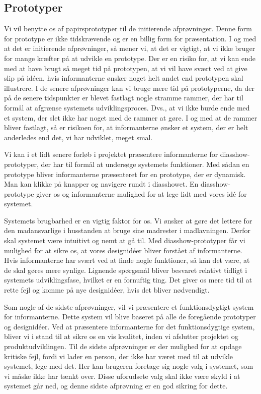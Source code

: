 \subsection{Prototyper}
\label{subsec:prototyper}

Vi vil benytte os af papirsprototyper til de initierende afprøvninger. Denne form for prototype er ikke tidskrævende og er en billig form for præsentation. I og med at det er initierende afprøvninger, så mener vi, at det er vigtigt, at vi ikke bruger for mange kræfter på at udvikle en prototype. Der er en risiko for, at vi kan ende med at have brugt så meget tid på prototypen, at vi vil have svært ved at give slip på idéen, hvis informanterne ønsker noget helt andet end prototypen skal illustrere. I de senere afprøvninger kan vi bruge mere tid på prototyperne, da der på de senere tidspunkter er blevet fastlagt nogle stramme rammer, der har til formål at afgrænse systemets udviklingsproces. Dvs., at vi ikke burde ende med et system, der slet ikke har noget med de rammer at gøre. I og med at de rammer bliver fastlagt, så er risikoen for, at informanterne ønsker et system, der er helt anderledes end det, vi har udviklet, meget smal.

Vi kan i et lidt senere forløb i projektet præsentere informanterne for diasshow-prototyper, der har til formål at undersøge systemets funktioner. Med sådan en prototype bliver informanterne præsenteret for en prototype, der er dynamisk. Man kan klikke på knapper og navigere rundt i diasshowet. En diasshow-prototype giver os og informanterne mulighed for at lege lidt med vores idé for systemet. 

Systemets brugbarhed er en vigtig faktor for os. Vi ønsker at gøre det lettere for den madansvarlige i husstanden at bruge sine madrester i madlavningen. Derfor skal systemet være intuitivt og nemt at gå til. Med diasshow-prototyper får vi mulighed for at sikre os, at vores designidéer bliver forstået af informanterne. Hvis informanterne \fx har svært ved at finde nogle funktioner, så kan det være, at de skal gøres mere synlige. Lignende spørgsmål bliver besvaret relativt tidligt i systemets udviklingsfase, hvilket er en fornuftig ting. Det giver os mere tid til at rette fejl og komme på nye designidéer, hvis det bliver nødvendigt.

Som nogle af de sidste afprøvninger, vil vi præsentere et funktionsdygtigt system for informanterne. Dette system vil blive baseret på alle de foregående prototyper og designidéer. Ved at præsentere informanterne for det funktionsdygtige system, bliver vi i stand til at sikre os en vis kvalitet, inden vi afslutter projektet og produktudviklingen. Til de sidste afprøvninger er der mulighed for at opdage kritiske fejl, fordi vi lader en person, der ikke har været med til at udvikle systemet, lege med det. Her kan brugeren foretage sig nogle valg i systemet, som vi måske ikke har tænkt over. Disse uforudsete valg skal ikke være skyld i at systemet går ned, og denne sidste afprøvning er en god sikring for dette. 